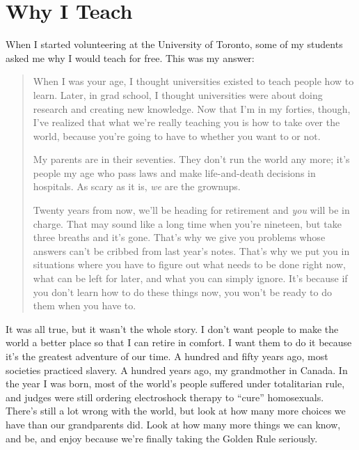 \chapter{Why I Teach}\label{s:finale}

When I started volunteering at the University of Toronto,
some of my students asked me why I would teach for free.
This was my answer:

\begin{quote}

When I was your age,
I thought universities existed to teach people how to learn.
Later,
in grad school,
I thought universities were about doing research and creating new knowledge.
Now that I'm in my forties,
though,
I've realized that what we're really teaching you is
how to take over the world,
because you're going to have to whether you want to or not.

My parents are in their seventies.
They don't run the world any more;
it's people my age who pass laws
and make life-and-death decisions in hospitals.
As scary as it is,
\emph{we} are the grownups.

Twenty years from now,
we'll be heading for retirement and \emph{you} will be in charge.
That may sound like a long time when you're nineteen,
but take three breaths and it's gone.
That's why we give you problems whose answers can't be cribbed from last year's notes.
That's why we put you in situations where
you have to figure out what needs to be done right now,
what can be left for later,
and what you can simply ignore.
It's because if you don't learn how to do these things now,
you won't be ready to do them when you have to.

\end{quote}

It was all true,
but it wasn't the whole story.
I don't want people to make the world a better place so that I can retire in comfort.
I want them to do it because it's the greatest adventure of our time.
A hundred and fifty years ago,
most societies practiced slavery.
A hundred years ago,
my grandmother  in Canada.
In the year I was born,
most of the world's people suffered under totalitarian rule,
and judges were still ordering electroshock therapy to ``cure'' homosexuals.
There's still a lot wrong with the world,
but look at how many more choices we have than our grandparents did.
Look at how many more things we can know, and be, and enjoy
because we're finally taking the Golden Rule seriously.

